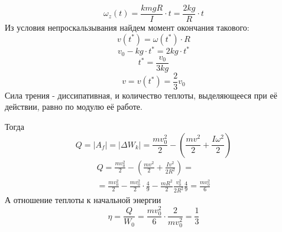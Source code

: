 \documentclass[a5paper,10pt]{article}
\begin{document}
\begin{equation}
	\omega_z(t)=\frac{kmgR}{I}\cdot t=\frac{2kg}{R}\cdot t
\end{equation}
Из условия непроскальзывания найдем момент окончания такового:
\begin{equation}

	v(t^*)=\omega(t^*)\cdot R
\end{equation}
\begin{equation}
	v_0-kg\cdot t^*={2kg}\cdot t^*
\end{equation}
\begin{equation}
	t^*=\frac{v_0}{3kg}
\end{equation}
\begin{equation}
	v=v(t^*)=\frac{2}{3}v_0
\end{equation}
Сила трения - диссипативная, и количество теплоты, выделяющееся при её действии, равно по модулю её работе. 

Тогда
\begin{equation}
	Q=|A_f|=|\Delta W_k|=\frac{mv_0^2}{2}-\left(\frac{mv^2}{2}+\frac{I\omega^2}{2}\right)
\end{equation}
\begin{gather}
	Q=\frac{mv_0^2}{2}-\left(\frac{mv^2}{2}+\frac{Iv^2}{2R^2}\right)=\\=
	\frac{mv_0^2}{2}-\frac{mv_0^2}{2}\cdot\frac{4}{9}-\frac{mR^2}{2}\frac{v_0^2}{2R^2}\frac{4}{9}=\frac{mv_0^2}{6}
\end{gather}
А отношение теплоты к начальной энергии
\begin{equation}
	\eta=\frac{Q}{W_0}=\frac{mv_0^2}{6}\cdot\frac{2}{mv_0^2}=\frac13
\end{equation}
\end{document}

